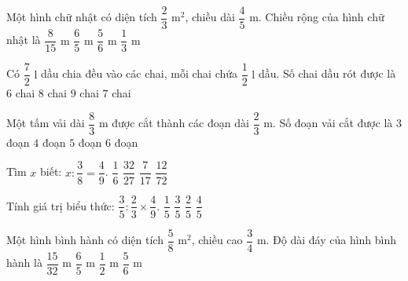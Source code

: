 \begin{ex} %
Một hình chữ nhật có diện tích $\dfrac{2}{3}\text{ m}^2$, chiều dài $\dfrac{4}{5}\text{ m}$. Chiều rộng của hình chữ nhật là
\choice
{$\dfrac{8}{15}\text{ m}$}
{$\dfrac{6}{5}\text{ m}$}
{\True $\dfrac{5}{6}\text{ m}$}
{$\dfrac{1}{3}\text{ m}$}
\end{ex}

\begin{ex} %
Có $\dfrac{7}{2}\text{ l}$ dầu chia đều vào các chai, mỗi chai chứa $\dfrac{1}{2}\text{ l}$ dầu. Số chai dầu rót được là
\choice
{$6$ chai}
{$8$ chai}
{$9$ chai}
{\True $7$ chai}
\end{ex}

\begin{ex} %
Một tấm vải dài $\dfrac{8}{3}\text{ m}$ được cắt thành các đoạn dài $\dfrac{2}{3}\text{ m}$. Số đoạn vải cắt được là
\choice
{$3$ đoạn}
{\True $4$ đoạn}
{$5$ đoạn}
{$6$ đoạn}
\end{ex}

\begin{ex} %
Tìm $x$ biết: $x : \dfrac{3}{8} = \dfrac{4}{9}$.
\choice
{\True $\dfrac{1}{6}$}
{$\dfrac{32}{27}$}
{$\dfrac{7}{17}$}
{$\dfrac{12}{72}$}
\end{ex}

\begin{ex} %
Tính giá trị biểu thức: $\dfrac{3}{5} : \dfrac{2}{3} \times \dfrac{4}{9}$.
\choice
{$\dfrac{1}{5}$}
{$\dfrac{3}{5}$}
{\True $\dfrac{2}{5}$}
{$\dfrac{4}{5}$}
\end{ex}

\begin{ex} %
Một hình bình hành có diện tích $\dfrac{5}{8}\text{ m}^2$, chiều cao $\dfrac{3}{4}\text{ m}$. Độ dài đáy của hình bình hành là
\choice
{$\dfrac{15}{32}\text{ m}$}
{$\dfrac{6}{5}\text{ m}$}
{$\dfrac{1}{2}\text{ m}$}
{\True $\dfrac{5}{6}\text{ m}$}
\end{ex}

